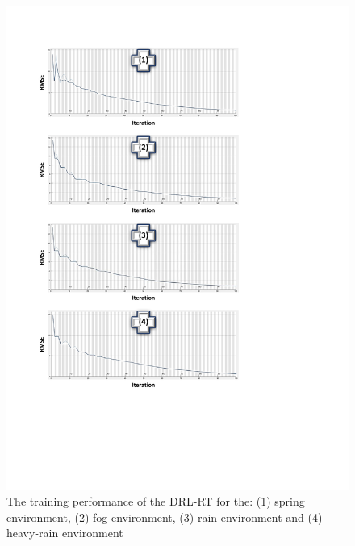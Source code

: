 \documentclass{svproc}
\begin{document}
	\begin{figure}[!t]
		\centering
		\includegraphics[scale=.5,trim=.5cm 10cm 4cm .5cm,clip]{training_curves.pdf}
		\caption{The training performance of the DRL-RT for the: (1) spring environment, (2) fog environment, (3) rain environment and (4) heavy-rain environment}
		\label{fig:training_curves}
	\end{figure}
	
\end{document}
